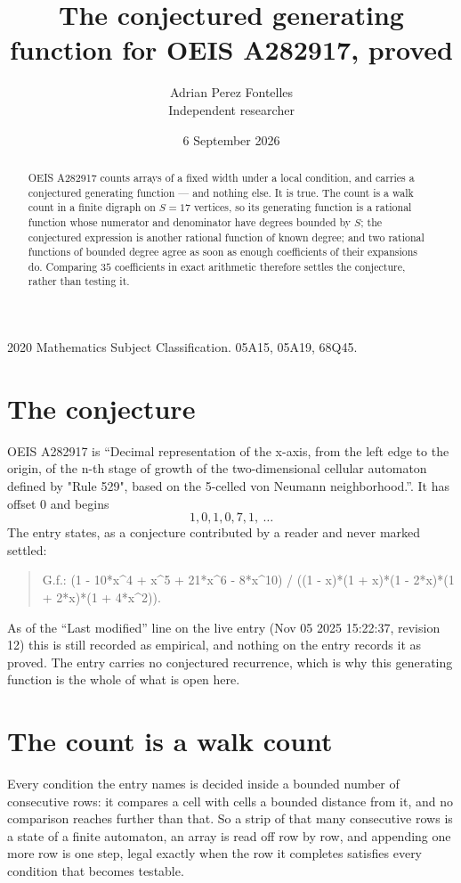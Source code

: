 \documentclass[11pt,a4paper]{article}
\title{The conjectured generating function for OEIS A282917, proved}
\author{Adrian Perez Fontelles\\ \small Independent researcher}
\date{6 September 2026}
\theoremstyle{plain}
\theoremstyle{definition}
\begin{document}
\maketitle

\begin{abstract}
OEIS A282917 counts arrays of a fixed width under a local condition, and carries a conjectured
generating function --- and nothing else. It is true. The count is a walk count in a finite
digraph on $S=17$ vertices, so its generating function is a rational function whose numerator
and denominator have degrees bounded by $S$; the conjectured expression is another rational
function of known degree; and two rational functions of bounded degree agree as soon as enough
coefficients of their expansions do. Comparing $35$ coefficients in exact arithmetic
therefore settles the conjecture, rather than testing it.
\end{abstract}

\noindent\small 2020 Mathematics Subject Classification. 05A15, 05A19, 68Q45.\normalsize

\section{The conjecture}

OEIS A282917 is ``Decimal representation of the x-axis, from the left edge to the origin, of the n-th stage of growth of the two-dimensional cellular automaton defined by "Rule 529", based on the 5-celled von Neumann neighborhood.''. It has offset $0$ and begins
\[
1, 0, 1, 0, 7, 1,\ \dots
\]
The entry states, as a conjecture contributed by a reader and never marked settled:
\begin{quote}
G.f.: (1 - 10*x\^{}4 + x\^{}5 + 21*x\^{}6 - 8*x\^{}10) / ((1 - x)*(1 + x)*(1 - 2*x)*(1 + 2*x)*(1 + 4*x\^{}2)).
\end{quote}
As of the ``Last modified'' line on the live entry (Nov 05 2025 15:22:37, revision 12) this is still
recorded as empirical, and nothing on the entry records it as proved. The entry carries no
conjectured recurrence, which is why this generating function is the whole of what is open
here.

\section{The count is a walk count}

Every condition the entry names is decided inside a bounded number of consecutive rows: it
compares a cell with cells a bounded distance from it, and no comparison reaches further than
that. So a strip of that many consecutive rows is a state of a finite automaton, an array is
read off row by row, and appending one more row is one step, legal exactly when the row it
completes satisfies every condition that becomes testable.
\end{document}
